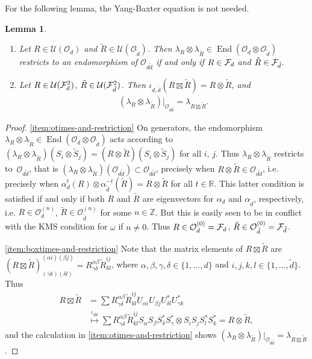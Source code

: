 \documentclass[12pt,a4paper]{amsart}
\numberwithin{equation}{section}
\newtheorem{lemma}[theorem]{Lemma}
\theoremstyle{remark}
\def\End{\operatorname{End}}
\newcommand{\ot}{\otimes}
\newcommand{\Rl}{\mathbb{R}}
\newcommand{\Zl}{\mathbb{Z}}
\newcommand{\om}{\omega}
\newcommand{\la}{\lambda}
\newcommand{\CO}[0]{\mathcal{O}} \newcommand{\CP}[0]{\mathcal{P}}
\newcommand{\CU}[0]{\mathcal{U}} \newcommand{\CV}[0]{\mathcal{V}}
\begin{document}
For the following lemma, the Yang-Baxter equation is not needed.
\begin{lemma}\leavevmode
	\begin{enumerate}
	 \item\label{item:otimes-and-restriction} Let $R\in\CU(\CO_d)$ and $\tilde R\in\CU(\CO_{\tilde d})$. Then $\la_R\ot\la_{\tilde R}\in\End(\CO_d\ot\CO_{\tilde d})$ restricts to an endomorphism of $\CO_{d\tilde d}$ if and only if $R\in\mathcal{F}_d$ and $\tilde R\in\mathcal{F}_{\tilde d}$.
	 \item\label{item:boxtimes-and-restriction} Let $R\in\CU(\CF_d^2)$, $\tilde R\in\CU(\CF_{\tilde d}^2)$. Then $\iota_{d,\tilde d}(R\boxtimes\tilde R)=R\otimes\tilde R$, and 
	\begin{align}
		(\la_R\otimes\la_{\tilde R})|_{\CO_{d\tilde d}}
		=
		\la_{R\boxtimes\tilde R}
		.
	\end{align}
	\end{enumerate}
\end{lemma}
\begin{proof}
	\ref{item:otimes-and-restriction} On generators, the endomorphism $\la_R\ot\la_{\tilde R}\in\End(\CO_d\ot\CO_{\tilde d})$ acts according to $(\lambda_R \otimes \lambda_{\tilde R})(S_i \otimes \tilde S_j)= (R \otimes \tilde R) (S_i \otimes \tilde S_j)$ for all $i$, $j$. Thus $\lambda_R \otimes \lambda_{\tilde R}$ restricts to~$\CO_{d\tilde d}$, that is $(\lambda_R \otimes \lambda_{\tilde R})(\CO_{d\tilde d}) \subset \CO_{d\tilde d}$, precisely when $R \otimes \tilde R \in \CO_{d\tilde d}$, i.e. precisely when $\alpha_d^t(R) \otimes \alpha_{\tilde d}^{-t}(\tilde R) = R \otimes \tilde R$ for all $t \in \Rl$. This latter condition is satisfied if and only if both $R$ and $\tilde R$ are eigenvectors for $\alpha_d$ and $\alpha_{\tilde d}$, respectively, i.e. $R\in\CO_d^{(n)}$, ${\tilde R}\in\CO_{\tilde d}^{(n)}$ for some $n\in\Zl$. But this is easily seen to be in conflict with the KMS condition for $\om$ if $n\neq0$. Thus $R\in\CO_d^{(0)}=\CF_d$, $\tilde R\in\CO_{\tilde d}^{(0)}=\CF_{\tilde d}$.
	
	\ref{item:boxtimes-and-restriction} Note that the matrix elements of $R\boxtimes\tilde R$ are $(R\boxtimes\tilde R)^{(\alpha i)(\beta j)}_{(\gamma k)(\delta l)}=R^{\alpha\beta}_{\gamma\delta}\tilde R^{ij}_{kl}$, where $\alpha,\beta,\gamma,\delta\in\{1,\ldots,d\}$ and $i,j,k,l\in\{1,\ldots,\tilde d\}$. Thus
	\begin{align*}
		R\boxtimes\tilde R
		&=
		\sum R^{\alpha\beta}_{\gamma\delta}\tilde R^{ij}_{kl} U_{\alpha i}U_{\beta j}U_{\delta l}^*U_{\gamma k}^*
		\\
		&\stackrel{\iota_{d\tilde d}}{\longmapsto}
		\sum R^{\alpha\beta}_{\gamma\delta}\tilde R^{ij}_{kl} S_\alpha S_\beta S_\delta^* S_\gamma^* \otimes S_iS_jS_l^*S_k^*
		=
		R\otimes\tilde R,
	\end{align*}
	and the calculation in \ref{item:otimes-and-restriction} shows $(\la_R\otimes\la_{\tilde R})|_{\CO_{d\tilde d}}=\la_{R\boxtimes\tilde R}$.
\end{proof}
\end{document}
